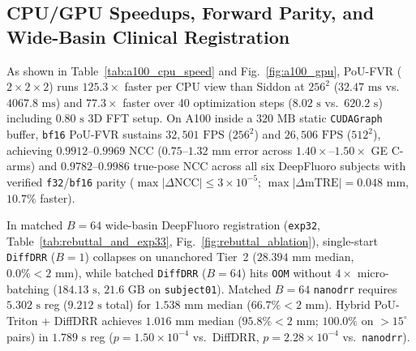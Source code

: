 \documentclass[runningheads]{llncs}
\begin{document}
\subsection{CPU/GPU Speedups, Forward Parity, and Wide-Basin Clinical Registration}
As shown in Table~\ref{tab:a100_cpu_speed} and Fig.~\ref{fig:a100_gpu}, PoU-FVR ($2{\times}2{\times}2$) runs $125.3\times$ faster per CPU view than Siddon at $256^2$ ($32.47\text{ ms}$ vs.\ $4067.8\text{ ms}$) and $77.3\times$ faster over 40 optimization steps ($8.02\text{ s}$ vs.\ $620.2\text{ s}$) including $0.80\text{ s}$ 3D FFT setup. On A100 inside a $320\text{ MB}$ static \texttt{CUDAGraph} buffer, \texttt{bf16} PoU-FVR sustains $32{,}501\text{ FPS}$ ($256^2$) and $26{,}506\text{ FPS}$ ($512^2$), achieving $0.9912$--$0.9969$ NCC ($0.75$--$1.32\text{ mm}$ error across $1.40\times$--$1.50\times$ GE C-arms) and $0.9782$--$0.9986$ true-pose NCC across all six DeepFluoro subjects with verified \texttt{f32}/\texttt{bf16} parity ($\max|\Delta\mathrm{NCC}| \le 3\times 10^{-5}$; $\max|\Delta\mathrm{mTRE}| = 0.048\text{ mm}$, $10.7\%$ faster).

In matched $B{=}64$ wide-basin DeepFluoro registration (\texttt{exp32}, Table~\ref{tab:rebuttal_and_exp33}, Fig.~\ref{fig:rebuttal_ablation}), single-start \texttt{DiffDRR} ($B{=}1$) collapses on unanchored Tier~2 ($28.394\text{ mm}$ median, $0.0\% <2\text{ mm}$), while batched \texttt{DiffDRR} ($B{=}64$) hits \texttt{OOM} without $4\times$ micro-batching ($184.13\text{ s}$, $21.6\text{ GB}$ on \texttt{subject01}). Matched $B{=}64$ \texttt{nanodrr} requires $5.302\text{ s}$ reg ($9.212\text{ s}$ total) for $1.538\text{ mm}$ median ($66.7\% <2\text{ mm}$). Hybrid PoU-Triton + DiffDRR achieves $1.016\text{ mm}$ median ($95.8\% <2\text{ mm}$; $100.0\%$ on $>15^\circ$ pairs) in $1.789\text{ s}$ reg ($p=1.50\times 10^{-4}$ vs.\ DiffDRR, $p=2.28\times 10^{-4}$ vs.\ \texttt{nanodrr}).
\end{document}
